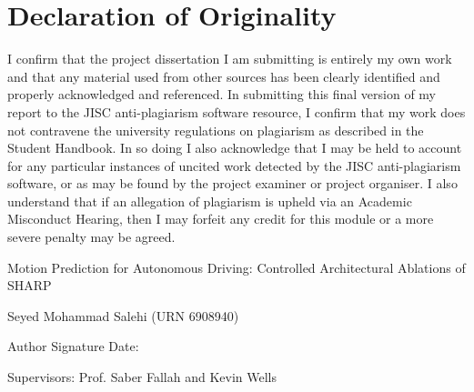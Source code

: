 \chapter*{Declaration of Originality}
I confirm that the project dissertation I am submitting is entirely my own work and that any material used from other sources has been clearly identified and properly acknowledged and referenced. In submitting this final version of my report to the JISC anti-plagiarism software resource, I confirm that my work does not contravene the university regulations on plagiarism as described in the Student Handbook. In so doing I also acknowledge that I may be held to account for any particular instances of uncited work detected by the JISC anti-plagiarism software, or as may be found by the project examiner or project organiser. I also understand that if an allegation of plagiarism is upheld via an Academic Misconduct Hearing, then I may forfeit any credit for this module or a more severe penalty may be agreed.

\vspace{2em}

\noindent Motion Prediction for Autonomous Driving: Controlled Architectural Ablations of SHARP

\vspace{2em}

\noindent Seyed Mohammad Salehi (URN 6908940)

\vspace{2em}

\noindent Author Signature \hfill Date:

\vspace{2em}

\noindent Supervisors: Prof. Saber Fallah and Kevin Wells
